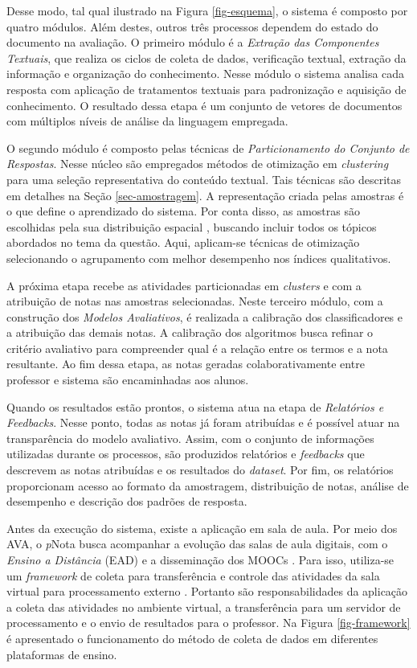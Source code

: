 Desse modo, tal qual ilustrado na Figura \ref{fig-esquema}, o sistema é composto por quatro módulos. Além destes, outros três processos dependem do estado do documento na avaliação. O primeiro módulo é a \textit{Extração das Componentes Textuais}, que realiza os ciclos de coleta de dados, verificação textual, extração da informação e organização do conhecimento. Nesse módulo o sistema analisa cada resposta com aplicação de tratamentos textuais para padronização e aquisição de conhecimento. O resultado dessa etapa é um conjunto de vetores de documentos com múltiplos níveis de análise da linguagem empregada.

O segundo módulo é composto pelas técnicas de \textit{Particionamento do Conjunto de Respostas}. Nesse núcleo são empregados métodos de otimização em \textit{clustering} para uma seleção representativa do conteúdo textual. Tais técnicas são descritas em detalhes na Seção \ref{sec-amostragem}. A representação criada pelas amostras é o que define o aprendizado do sistema. Por conta disso, as amostras são escolhidas pela sua distribuição espacial \cite{salton1975, baeza2011}, buscando incluir todos os tópicos abordados no tema da questão. Aqui, aplicam-se técnicas de otimização selecionando o agrupamento com melhor desempenho nos índices qualitativos. 

A próxima etapa recebe as atividades particionadas em \textit{clusters} e com a atribuição de notas nas amostras selecionadas. Neste terceiro módulo, com a construção dos \textit{Modelos Avaliativos}, é realizada a calibração dos classificadores e a atribuição das demais notas. A calibração dos algoritmos busca refinar o critério avaliativo para compreender qual é a relação entre os termos e a nota resultante. Ao fim dessa etapa, as notas geradas colaborativamente entre professor e sistema são encaminhadas aos alunos.

Quando os resultados estão prontos, o sistema atua na etapa de \textit{Relatórios e Feedbacks}. Nesse ponto, todas as notas já foram atribuídas e é possível atuar na transparência do modelo avaliativo. Assim, com o conjunto de informações utilizadas durante os processos, são produzidos relatórios e \textit{feedbacks} que descrevem as notas atribuídas e os resultados do \textit{dataset}. Por fim, os relatórios proporcionam acesso ao formato da amostragem, distribuição de notas, análise de desempenho e descrição dos padrões de resposta. 

Antes da execução do sistema, existe a aplicação em sala de aula. Por meio dos AVA, o \textit{p}Nota busca acompanhar a evolução das salas de aula digitais, com o \textit{Ensino a Distância} (EAD) e a disseminação dos MOOCs \cite{mohapatra2017}. Para isso, utiliza-se um \textit{framework} de coleta para transferência e controle das atividades da sala virtual para processamento externo \cite{spalenza2018}. Portanto são responsabilidades da aplicação a coleta das atividades no ambiente virtual, a transferência para um servidor de processamento e o envio de resultados para o professor. Na Figura \ref{fig-framework} é apresentado o funcionamento do método de coleta de dados em diferentes plataformas de ensino.

